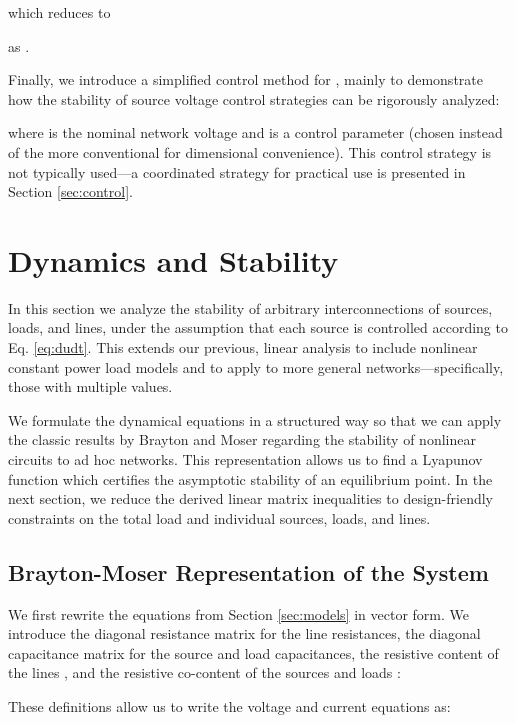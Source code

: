\documentclass[letterpaper, 10 pt, conference]{ieeeconf}
\begin{document}
which reduces to 

as .

Finally, we introduce a simplified control method for , mainly to demonstrate how the stability of source voltage control strategies can be rigorously analyzed:


where  is the nominal network voltage and  is a control parameter (chosen instead of the more conventional  for dimensional convenience). This control strategy is not typically used---a coordinated strategy for practical use is presented in Section \ref{sec:control}.

\section{Dynamics and Stability}\label{sec:dynamics}

In this section we analyze the stability of arbitrary interconnections of sources, loads, and lines, under the assumption that each source is controlled according to Eq. \eqref{eq:dudt}. This extends our previous, linear analysis \cite{compel} to include nonlinear constant power load models and to apply to more general networks---specifically, those with multiple  values.

We formulate the dynamical equations in a structured way so that we can apply the classic results by Brayton and Moser regarding the stability of nonlinear circuits \cite{Brayton:1964gr} to ad hoc networks. This representation allows us to find a Lyapunov function which certifies the asymptotic stability of an equilibrium point. In the next section, we reduce the derived linear matrix inequalities to design-friendly constraints on the total load and individual sources, loads, and lines.

\subsection{Brayton-Moser Representation of the System}

We first rewrite the equations from Section \ref{sec:models} in vector form. We introduce the diagonal resistance matrix  for the line resistances, the diagonal capacitance matrix  for the source and load capacitances, the resistive content of the lines , and the resistive co-content of the sources and loads  \cite{Jeltsema:2009jd}:




These definitions allow us to write the voltage and current equations as:
\end{document}
